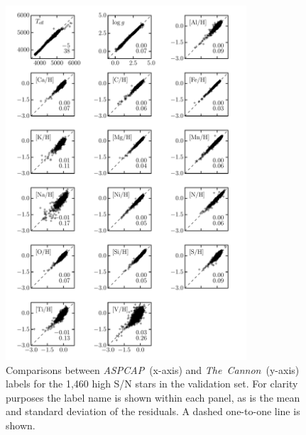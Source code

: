 \documentclass[12pt,preprint]{aastex}
\newcommand{\project}[1]{\textsl{#1}}
\newcommand{\TheCannon}{\project{The~Cannon}}
\newcommand{\acronym}[1]{{\small{#1}}}
\newcommand{\aspcap}{\project{\acronym{ASPCAP}}}
\begin{document}
\begin{figure}[p]
\centering
\includegraphics[width=0.8\textwidth]{regularized-model-validation.pdf}
\caption{Comparisons between \aspcap\ (x-axis) and \TheCannon\ (y-axis)
labels for the 1,460 high S/N stars in the validation set.  For clarity
purposes the label name is shown within each panel, as is the mean
and standard deviation of the residuals.  A
dashed one-to-one line is shown.
\label{fig:regularized-model-validation}}
\end{figure}

\clearpage
\end{document}
